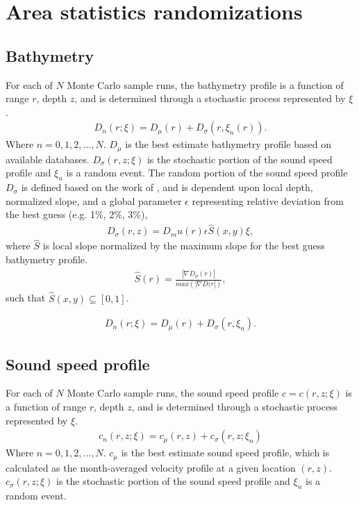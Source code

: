 \section{Area statistics randomizations}
%
\subsection{Bathymetry}
For each of $N$ Monte Carlo sample runs, the bathymetry profile is a
function of range $r$, depth $z$, and is determined through a
stochastic process represented by $\xi$.  
\begin{align*}
  D_n(r; \xi) = D_\mu(r) + D_\sigma(r,\xi_n(r)).%
\end{align*}
Where $n=0,1,2,...,N$. $D_\mu$ is the best estimate bathymetry profile
based on available databases. $D_\sigma(r,z;\xi)$ is the stochastic
portion of the sound speed profile and $\xi_n$ is a random event. The
random portion of the sound speed profile $D_\sigma$ is defined based
on the work of \cite{Lermusiaux2010}, and is dependent upon local
depth, normalized slope, and a global parameter $\epsilon$
representing relative deviation from the best guess (e.g. 1\%, 2\%, 3\%),
\begin{align*}
  D_\sigma(r,z)=D_mu(r)\epsilon\hat{S}(x,y)\xi,
\end{align*}
where $\hat{S}$ is local slope normalized by the maximum slope for the
best guess bathymetry profile.
\begin{align*}
  \hat{S}(r)=\frac{\left|\nabla D_\mu(r)\right|}{max(\left|\nabla D(r\right|)},
\end{align*}
such that $\hat{S}(x,y)\subseteq [0,1]$.

\begin{align*}
  D_n(r; \xi) = D_\mu(r) + D_\sigma(r,\xi_n).%
\end{align*}



%
\subsection{Sound speed profile}
For each of $N$ Monte Carlo sample runs, the sound speed profile
$c = c(r,z;\xi)$ is a function of range $r$, depth $z$, and is
determined through a stochastic process represented by $\xi$.
\begin{align*}%
  c_n(r,z;\xi) = c_\mu(r,z) + c_\sigma(r,z;\xi_n)%
\end{align*}%
Where $n=0,1,2,...,N$. $c_\mu$ is the best estimate sound speed
profile, which is calculated as the month-averaged velocity profile at
a given location $(r,z)$. $c_\sigma(r,z;\xi)$ is the stochastic
portion of the sound speed profile and $\xi_n$ is a random event.

